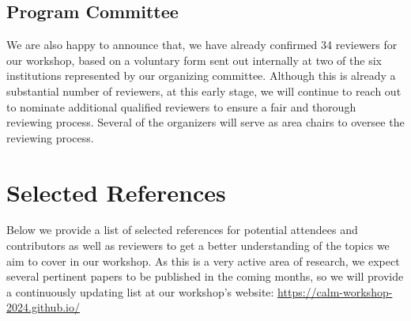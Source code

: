 \documentclass{article}
\begin{document}



\subsection{Program Committee}

We are also happy to announce that, we have already confirmed 34 reviewers for our workshop, based on a voluntary form sent out internally at two of the six institutions represented by our organizing committee. Although this is already a substantial number of reviewers, at this early stage, we will continue to reach out to nominate additional qualified reviewers 
to ensure a fair and thorough reviewing process.
Several of the organizers will serve as area chairs to oversee the reviewing process.



\section{Selected References}

Below we provide a list of selected references for potential attendees and contributors as well as reviewers to get a better understanding of the topics we aim to cover in our workshop. As this is a very active area of research, we expect several pertinent papers to be published in the coming months, so we will provide a continuously updating list at our workshop's website: \url{https://calm-workshop-2024.github.io/}



\renewcommand{\bibsection}{}


\nocite{liuLargeLanguageModels2024,
yang2023critical,
anwar2024foundational, jin2024cladder, kasetty2024evaluating,park2023linear,geiger2024finding,nie2024moca,zevcevic2023causal,vashishtha2023causal, reizinger2024understanding, willig2022can, xia2021causal, d2022underspecification, long2023causal, rajendran2024learning, jiang2024origins, wang2024concept}
\nocite{gupta2024context_is_env, lampinen2023passive, wu2024interpretability}
\nocite{kiciman2023causal}
\nocite{montagna2024demystifying}
\nocite{daunhawer2023identifiability}
\nocite{sanchez2022diffusion}
\nocite{pan2024counterfactual, li2024steering}
\nocite{abdulaal2024causal}
\nocite{richens2024robust}
\nocite{feder2024causal}







\end{document}
